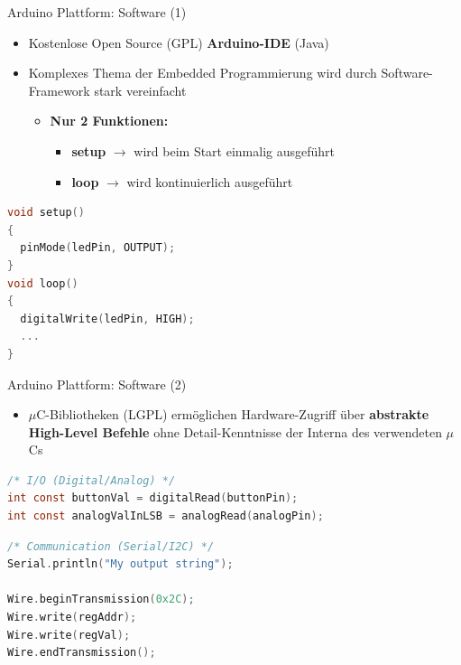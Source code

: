 \documentclass{beamer}
\begin{document}
\begin{frame}[fragile]{Arduino Plattform: Software (1)}
\begin{itemize}
	\item Kostenlose Open Source (GPL) \textbf{Arduino-IDE} (Java)
\end{itemize}
\begin{itemize}
	\item Komplexes Thema der Embedded Programmierung wird durch Software-Framework stark vereinfacht
	\begin{itemize}
	 	\item \textbf{Nur 2 Funktionen:}
	 	\begin{itemize}
	 		\item \textbf{setup} $\rightarrow$ wird beim Start einmalig ausgef\"uhrt
	 		\item \textbf{loop} $\rightarrow$ wird kontinuierlich ausgef\"uhrt
	 	\end{itemize}
	 \end{itemize}
\end{itemize}
\begin{lstlisting}[frame=single, language=C]
void setup()
{
  pinMode(ledPin, OUTPUT);
}
void loop()
{
  digitalWrite(ledPin, HIGH);
  ...
}
\end{lstlisting}
\end{frame}
\begin{frame}[fragile]{Arduino Plattform: Software (2)}
\begin{itemize}
 	\item $\mu$C-Bibliotheken (LGPL) erm\"oglichen Hardware-Zugriff \"uber \textbf{abstrakte High-Level Befehle} ohne Detail-Kenntnisse der Interna des verwendeten $\mu$Cs
\end{itemize}
\begin{lstlisting}[frame=single, language=C]
/* I/O (Digital/Analog) */
int const buttonVal = digitalRead(buttonPin);
int const analogValInLSB = analogRead(analogPin); 
\end{lstlisting}
\begin{lstlisting}[frame=single, language=C]
/* Communication (Serial/I2C) */
Serial.println("My output string");

Wire.beginTransmission(0x2C);
Wire.write(regAddr);
Wire.write(regVal);
Wire.endTransmission();
\end{lstlisting}
\end{frame}
\end{document}
